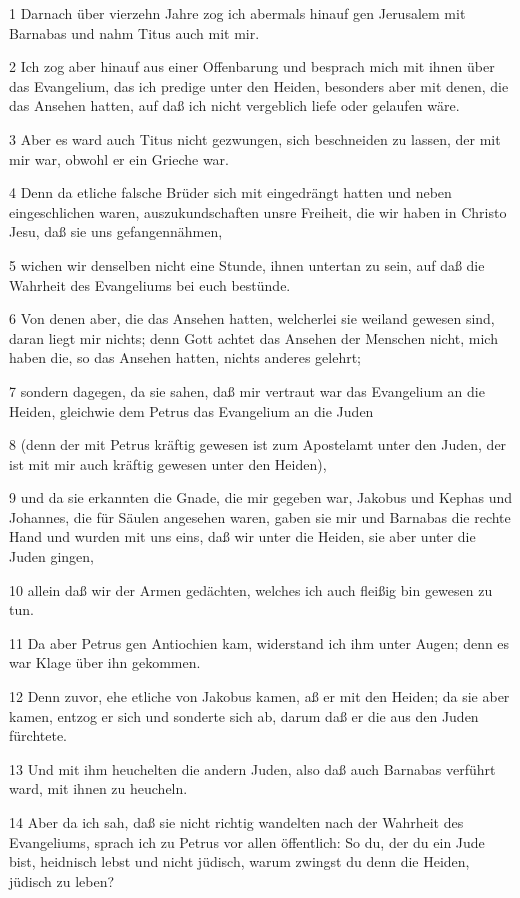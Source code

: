 \par 1 Darnach über vierzehn Jahre zog ich abermals hinauf gen Jerusalem mit Barnabas und nahm Titus auch mit mir.
\par 2 Ich zog aber hinauf aus einer Offenbarung und besprach mich mit ihnen über das Evangelium, das ich predige unter den Heiden, besonders aber mit denen, die das Ansehen hatten, auf daß ich nicht vergeblich liefe oder gelaufen wäre.
\par 3 Aber es ward auch Titus nicht gezwungen, sich beschneiden zu lassen, der mit mir war, obwohl er ein Grieche war.
\par 4 Denn da etliche falsche Brüder sich mit eingedrängt hatten und neben eingeschlichen waren, auszukundschaften unsre Freiheit, die wir haben in Christo Jesu, daß sie uns gefangennähmen,
\par 5 wichen wir denselben nicht eine Stunde, ihnen untertan zu sein, auf daß die Wahrheit des Evangeliums bei euch bestünde.
\par 6 Von denen aber, die das Ansehen hatten, welcherlei sie weiland gewesen sind, daran liegt mir nichts; denn Gott achtet das Ansehen der Menschen nicht, mich haben die, so das Ansehen hatten, nichts anderes gelehrt;
\par 7 sondern dagegen, da sie sahen, daß mir vertraut war das Evangelium an die Heiden, gleichwie dem Petrus das Evangelium an die Juden
\par 8 (denn der mit Petrus kräftig gewesen ist zum Apostelamt unter den Juden, der ist mit mir auch kräftig gewesen unter den Heiden),
\par 9 und da sie erkannten die Gnade, die mir gegeben war, Jakobus und Kephas und Johannes, die für Säulen angesehen waren, gaben sie mir und Barnabas die rechte Hand und wurden mit uns eins, daß wir unter die Heiden, sie aber unter die Juden gingen,
\par 10 allein daß wir der Armen gedächten, welches ich auch fleißig bin gewesen zu tun.
\par 11 Da aber Petrus gen Antiochien kam, widerstand ich ihm unter Augen; denn es war Klage über ihn gekommen.
\par 12 Denn zuvor, ehe etliche von Jakobus kamen, aß er mit den Heiden; da sie aber kamen, entzog er sich und sonderte sich ab, darum daß er die aus den Juden fürchtete.
\par 13 Und mit ihm heuchelten die andern Juden, also daß auch Barnabas verführt ward, mit ihnen zu heucheln.
\par 14 Aber da ich sah, daß sie nicht richtig wandelten nach der Wahrheit des Evangeliums, sprach ich zu Petrus vor allen öffentlich: So du, der du ein Jude bist, heidnisch lebst und nicht jüdisch, warum zwingst du denn die Heiden, jüdisch zu leben?
